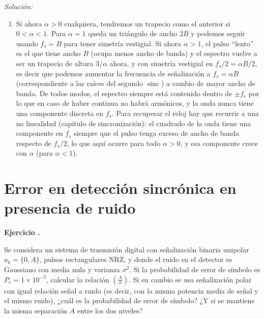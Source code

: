 \documentclass[a4paper,11pt]{article}
\DeclareMathOperator{\sinc}{sinc}
\newcounter{numejer}[section]
\newenvironment{ejercicio}[1][]{
\refstepcounter{numejer}
\noindent \large \textbf{Ejercicio \arabic{section}.\arabic{numejer}} \ifthenelse{\equal{#1}{}}{}{\emph{(#1)}}

\smallskip
}{
\bigskip
}
\newenvironment{solucion}[1][]{
\noindent \large \textsl{Solución:} \ifthenelse{\equal{#1}{}}{}{\emph{(#1)}}

\smallskip
}{
\bigskip
}
\begin{document}
\begin{solucion}
\begin{enumerate}
 La energía media del pulso transmitido surge de $\bar{E}_p = E[a_k^2]||p||^2$. Integrando en frecuencia, $||p||^2 = 9\left[\frac{B}{6} + \frac{B}{2} + \frac{B}{6} \right] = \frac{15}{2}B$, de donde $\bar{E}_p = \frac{15}{2}A^2B$. Como $E[a_k^2]$ no depende de las probabilidades, la energía media del pulso es la misma en ambos casos.

 \item Si ahora $\alpha>0$ cualquiera, tendremos un trapecio como el anterior si $0<\alpha<1$. Para $\alpha=1$ queda un triángulo de ancho $2B$ y podemos seguir usando $f_s=B$ para tener simetría vestigial. Si ahora $\alpha>1$, el pulso ``lento'' es el que tiene ancho $B$ (ocupa menos ancho de banda) y el espectro vuelve a ser un trapecio de altura $3/\alpha$ ahora, y con simetría vestigial en $f_s/2 = \alpha B/2$, es decir que podemos aumentar la frecuencia de señalización a $f_s=\alpha B$ (correspondiente a las raíces del segundo $\sinc$) a cambio de mayor ancho de banda. De todos modos, el espectro siempre está contenido dentro de $\pm f_s$ por lo que en caso de haber continua no habrá armónicos, y la onda nunca tiene una componente discreta en $f_s$. Para recuperar el reloj hay que recurrir a una no linealidad (capítulo de sincronización): el cuadrado de la onda tiene una componente en $f_s$ siempre que el pulso tenga exceso de ancho de banda respecto de $f_s/2$, lo que aquí ocurre para todo $\alpha>0$, y esa componente crece con $\alpha$ (para $\alpha<1$).
\end{enumerate}

\end{solucion}

\section{Error en detección sincrónica en presencia de ruido}

\begin{ejercicio}
Se considera un sistema de trasmisión digital con señalización binaria unipolar $a_k=\{0,A\}$, pulsos rectangulares NRZ, y donde el ruido en el detector es Gaussiano con media nula y varianza $\sigma^2$. Si la probabilidad de error de símbolo es $P_e=1\times 10^{-5}$, calcular la relación $\left(\frac{A}{\sigma}\right)$. Si en cambio se usa señalización polar con igual relación señal a ruido (es decir, con la misma potencia media de señal y el mismo ruido), ¿cuál es la probabilidad de error de símbolo? ¿Y si se mantiene la misma separación $A$ entre los dos niveles?
\end{ejercicio}
\end{document}

